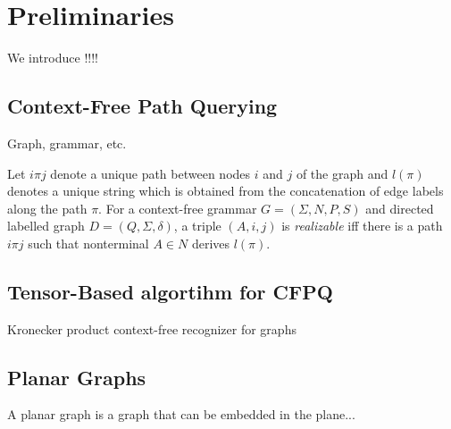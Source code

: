 \section{Preliminaries}

We introduce !!!!

\subsection{Context-Free Path Querying}

Graph, grammar, etc.

Let $i\pi j$ denote a unique path between nodes $i$ and $j$ of the graph and $l(\pi)$ denotes a unique string which is obtained from the concatenation of edge labels along the path $\pi$.
For a context-free grammar $G = (\Sigma, N, P, S)$ and directed labelled graph $D = (Q, \Sigma, \delta)$, a triple $(A, i, j)$ is \textit{realizable} iff there is a path $i\pi j$ such that nonterminal $A \in N$ derives $l(\pi)$.

\subsection{Tensor-Based algortihm for CFPQ}

\begin{algorithm}[H]
\begin{algorithmic}[1]
\caption{Kronecker product context-free recognizer for graphs}
\label{alg:Kronecker}
\EndFunction
\end{algorithmic}
\end{algorithm}

\subsection{Planar Graphs}

A planar graph is a graph that can be embedded in the plane...
